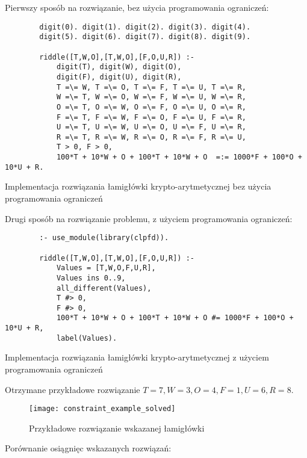     Pierwszy sposób na rozwiązanie, bez użycia programowania ograniczeń:

    \begin{listing}[H]
        \begin{verbatim}
        digit(0). digit(1). digit(2). digit(3). digit(4).
        digit(5). digit(6). digit(7). digit(8). digit(9).

        riddle([T,W,O],[T,W,O],[F,O,U,R]) :-
            digit(T), digit(W), digit(O),
            digit(F), digit(U), digit(R),
            T =\= W, T =\= O, T =\= F, T =\= U, T =\= R,
            W =\= T, W =\= O, W =\= F, W =\= U, W =\= R, 
            O =\= T, O =\= W, O =\= F, O =\= U, O =\= R,
            F =\= T, F =\= W, F =\= O, F =\= U, F =\= R,
            U =\= T, U =\= W, U =\= O, U =\= F, U =\= R,  
            R =\= T, R =\= W, R =\= O, R =\= F, R =\= U,
            T > 0, F > 0,
            100*T + 10*W + O + 100*T + 10*W + O  =:= 1000*F + 100*O + 10*U + R. 
        \end{verbatim}
    \caption{Implementacja rozwiązania łamigłówki krypto-arytmetycznej bez użycia programowania ograniczeń}
    \end{listing}

    Drugi sposób na rozwiązanie problemu, z użyciem programowania ograniczeń:

    \begin{listing}[H]
        \begin{verbatim}
        :- use_module(library(clpfd)).

        riddle([T,W,O],[T,W,O],[F,O,U,R]) :-
            Values = [T,W,O,F,U,R],
            Values ins 0..9,
            all_different(Values),
            T #> 0,
            F #> 0,
            100*T + 10*W + O + 100*T + 10*W + O #= 1000*F + 100*O + 10*U + R,
            label(Values).
        \end{verbatim}
    \caption{Implementacja rozwiązania łamigłówki krypto-arytmetycznej z użyciem programowania ograniczeń}
    \end{listing}

    Otrzymane przykładowe rozwiązanie $T=7, W=3, O=4, F=1, U=6, R=8$.

    \begin{figure}[H]
        \texttt{[image: constraint\_example\_solved]}
        \centering
        \caption{Przykładowe rozwiązanie wskazanej łamigłówki}
    \end{figure} 

    Porównanie osiągnięc wskazanych rozwiązań:
    
